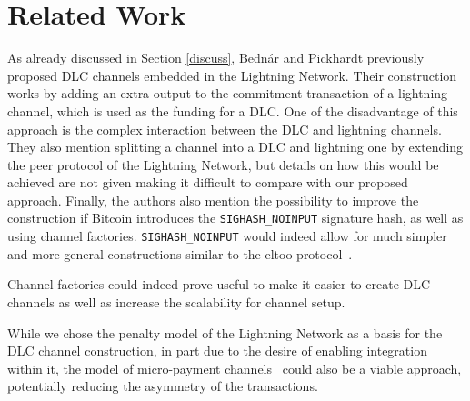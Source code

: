 \section{Related Work}\label{related}

As already discussed in Section \ref{discuss}, Bedn\'ar and Pickhardt \cite{bednar2019} previously proposed DLC channels embedded in the Lightning Network.
Their construction works by adding an extra output to the commitment transaction of a lightning channel, which is used as the funding for a DLC.
One of the disadvantage of this approach is the complex interaction between the DLC and lightning channels.
They also mention splitting a channel into a DLC and lightning one by extending the peer protocol of the Lightning Network, but details on how this would be achieved are not given making it difficult to compare with our proposed approach.
Finally, the authors also mention the possibility to improve the construction if Bitcoin introduces the \texttt{SIGHASH\_NOINPUT} signature hash, as well as using channel factories.
\texttt{SIGHASH\_NOINPUT} would indeed allow for much simpler and more general constructions similar to the eltoo protocol~\cite{decker2018eltoo}.

Channel factories \cite{burchert2018scalable} could indeed prove useful to make it easier to create DLC channels as well as increase the scalability for channel setup.

While we chose the penalty model of the Lightning Network as a basis for the DLC channel construction, in part due to the desire of enabling integration within it, the model of micro-payment channels~\cite{decker2015fast} could also be a viable approach, potentially reducing the asymmetry of the transactions.
